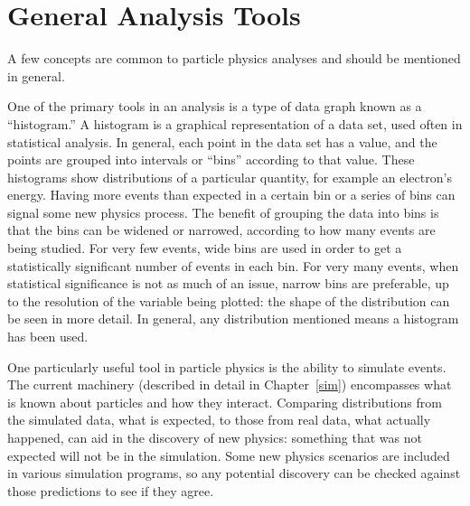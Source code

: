 \section{General Analysis Tools} %


A few concepts are common to particle physics 
analyses and should be mentioned in general.  

One of the primary tools in an analysis 
is a type of data graph known as a ``histogram.'' 
A histogram is a graphical representation 
of a data set, used often in statistical analysis.  
In general, each point in the data set has a value, 
and the points are grouped into intervals or ``bins'' 
according to that value.  
These histograms show distributions of 
a particular quantity, 
for example an electron's energy.  
Having more events than expected in a certain 
bin or a series of bins can 
signal some new physics process.  
The benefit of grouping the data into bins 
is that the bins can be widened or narrowed, 
according to how many events are being studied.  
For very few events, wide bins are used 
in order to get a statistically significant 
number of events in each bin.  
For very many events, when statistical 
significance is not as much of an issue, 
narrow bins are preferable, 
up to the resolution of the variable being plotted: 
the shape of the distribution 
can be seen in more detail.  
In general, any distribution mentioned 
means a histogram has been used.  

One particularly useful tool in particle physics 
is the ability to simulate events.  
The current machinery 
(described in detail in Chapter~\ref{sim}) 
encompasses what is known about particles 
and how they interact.  
Comparing distributions from 
the simulated data, 
what is expected, 
to those from real data, what actually happened, 
can aid in the discovery of new physics: 
something that was not expected 
will not be in the simulation.  
Some new physics scenarios are 
included in various simulation programs, 
so any potential discovery can be checked 
against those predictions to see if they agree.  


